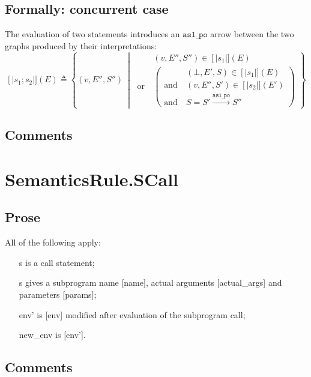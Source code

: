 \documentclass{book}
\newcommand\llbracket{[|}
\newcommand\rrbracket{|]}
\newcommand\interp[1]{\left\llbracket #1 \right\rrbracket}
\newcommand\st[0]{\ \middle|\ }
\newcommand\aslpo[0]{\mathtt{asl\_po}}
\begin{document}
  \subsection{Formally: concurrent case}
  The evaluation of two statements introduces an $\aslpo$ arrow between the two
graphs produced by their interpretations:
  \begin{equation}
    \interp{s_1; s_2} (E) \triangleq
      \left\{ (v, E'', S'') \st{}
      \begin{aligned}
        & (v, E'', S'') \in \interp{s_1} (E)
        \\ \text{or}\ &
        \left(
        \begin{aligned}
            & (\bot{}, E', S) \in \interp{s_1} (E)
            \\ \text{and}\ &
            (v, E'', S') \in \interp{s_2} (E')
            \\ \text{and}\ &
            S = S' \xrightarrow{\aslpo} S''
        \end{aligned}
        \right)
      \end{aligned}
      \right\}
    \label{eq:sem-conc-sseq}
  \end{equation}

  \subsection{Comments}

\section{SemanticsRule.SCall \label{sec:SemanticsRule.SCall}}

    \subsection{Prose}
    All of the following apply:
    \begin{itemize}
    \item [s] is a call statement;
    \item [s] gives a subprogram name [name], actual arguments [actual\_args] and
      parameters [params];
    \item [env'] is [env] modified after evaluation of the subprogram call;
    \item [new\_env] is [env'].
    \end{itemize}

    \subsection{Comments}
\end{document}
